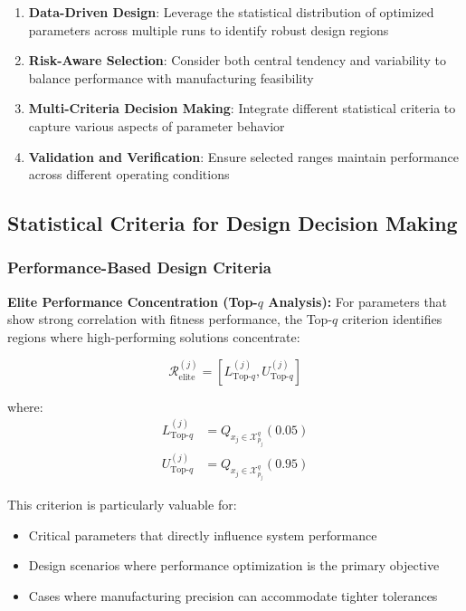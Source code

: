 \documentclass[12pt,a4paper]{article}
\begin{document}
\begin{enumerate}
    \item \textbf{Data-Driven Design}: Leverage the statistical distribution of optimized parameters across multiple runs to identify robust design regions
    \item \textbf{Risk-Aware Selection}: Consider both central tendency and variability to balance performance with manufacturing feasibility
    \item \textbf{Multi-Criteria Decision Making}: Integrate different statistical criteria to capture various aspects of parameter behavior
    \item \textbf{Validation and Verification}: Ensure selected ranges maintain performance across different operating conditions
\end{enumerate}

\subsection{Statistical Criteria for Design Decision Making}

\subsubsection{Performance-Based Design Criteria}

\textbf{Elite Performance Concentration (Top-$q$ Analysis):}
For parameters that show strong correlation with fitness performance, the Top-$q$ criterion identifies regions where high-performing solutions concentrate:

\begin{equation}
\mathcal{R}_{\text{elite}}^{(j)} = [L_{\text{Top-$q$}}^{(j)}, U_{\text{Top-$q$}}^{(j)}]
\end{equation}

where:
\begin{align}
L_{\text{Top-$q$}}^{(j)} &= Q_{x_j \in \mathcal{X}^{q}_{p_j}}(0.05) \\
U_{\text{Top-$q$}}^{(j)} &= Q_{x_j \in \mathcal{X}^{q}_{p_j}}(0.95)
\end{align}

This criterion is particularly valuable for:
\begin{itemize}
    \item Critical parameters that directly influence system performance
    \item Design scenarios where performance optimization is the primary objective
    \item Cases where manufacturing precision can accommodate tighter tolerances
\end{itemize}
\end{document}
